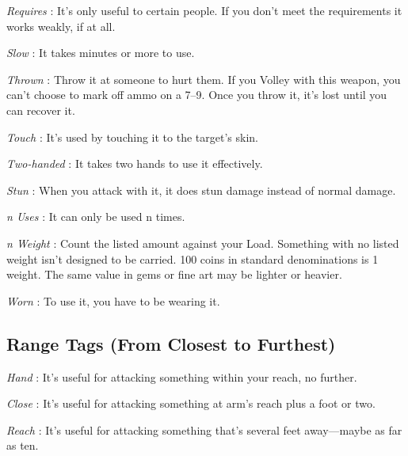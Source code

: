        

         {\em Requires} : It's only useful to certain people. If you don't meet the requirements it works weakly, if at all.

       

         {\em Slow} : It takes minutes or more to use.

       

         {\em Thrown} : Throw it at someone to hurt them. If you Volley with this weapon, you can't choose to mark off ammo on a 7–9. Once you throw it, it's lost until you can recover it.  

       

         {\em Touch} : It's used by touching it to the target's skin.

       

         {\em Two-handed} : It takes two hands to use it effectively.

       

         {\em Stun} : When you attack with it, it does stun damage instead of normal damage. 

       

         {\em n Uses} : It can only be used n times. 

       

         {\em n Weight} : Count the listed amount against your Load. Something with no listed weight isn't designed to be carried. 100 coins in standard denominations is 1 weight. The same value in gems or fine art may be lighter or heavier.

       

         {\em Worn} : To use it, you have to be wearing it.

       
\subsection{Range Tags (From Closest to Furthest)}       
       

         {\em Hand} : It's useful for attacking something within your reach, no further.

       

         {\em Close} : It's useful for attacking something at arm's reach plus a foot or two.

       

         {\em Reach} : It's useful for attacking something that's several feet away—maybe as far as ten. 


